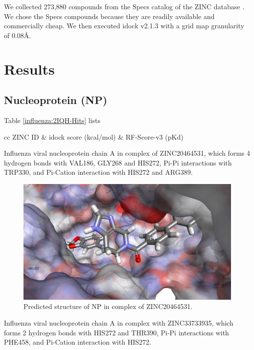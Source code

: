 We collected 273,880 compounds from the Specs catalog of the ZINC database \citep{532,1178}. We chose the Specs compounds because they are readily available and commercially cheap. We then executed idock v2.1.3 with a grid map granularity of 0.08\AA.

\section{Results}

\subsection{Nucleoprotein (NP)}

Table \ref{influenza:2IQH-Hits} lists

\begin{table}
\caption{Top ligands .}
\label{influenza:2IQH-Hits}
\begin{tabular}{cc}
\hline
ZINC ID & idock score (kcal/mol) & RF-Score-v3 (pKd)\\
\hline
\hline
\end{tabular}
\end{table}

Influenza viral nucleoprotein chain A in complex of ZINC20464531, which forms 4 hydrogen bonds with VAL186, GLY268 and HIS272, Pi-Pi interactions with TRP330, and Pi-Cation interaction with HIS272 and ARG389.

\begin{figure}
\centering
\includegraphics[width=\linewidth]{../influenza/2IQH-ZINC20464531.png}
\caption{Predicted structure of NP in complex of ZINC20464531.}
\label{influenza:2IQH-ZINC20464531}
\end{figure}

Influenza viral nucleoprotein chain A in complex with ZINC33733935, which forms 2 hydrogen bonds with HIS272 and THR390, Pi-Pi interactions with PHE458, and Pi-Cation interaction with HIS272.

